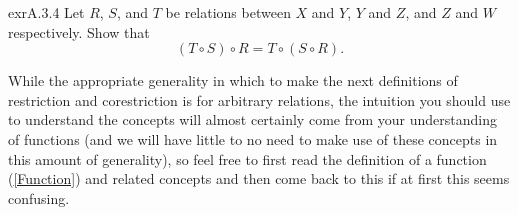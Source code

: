 \begin{exr}{}{exrA.3.4}
Let $R$, $S$, and $T$ be relations between $X$ and $Y$, $Y$ and $Z$, and $Z$ and $W$ respectively.  Show that
\begin{equation}
(T\circ S)\circ R=T\circ (S\circ R).
\end{equation}
\end{exr}
While the appropriate generality in which to make the next definitions of restriction and corestriction is for arbitrary relations, the intuition you should use to understand the concepts will almost certainly come from your understanding of functions (and we will have little to no need to make use of these concepts in this amount of generality), so feel free to first read the definition of a function (\cref{Function}) and related concepts and then come back to this if at first this seems confusing.
